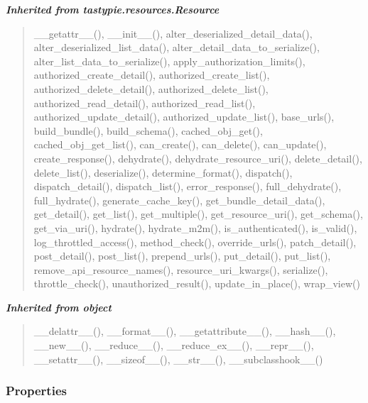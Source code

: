 \large{\textbf{\textit{Inherited from tastypie.resources.Resource}}}

\begin{quote}
\_\_getattr\_\_(), \_\_init\_\_(), alter\_deserialized\_detail\_data(), alter\_deserialized\_list\_data(), alter\_detail\_data\_to\_serialize(), alter\_list\_data\_to\_serialize(), apply\_authorization\_limits(), authorized\_create\_detail(), authorized\_create\_list(), authorized\_delete\_detail(), authorized\_delete\_list(), authorized\_read\_detail(), authorized\_read\_list(), authorized\_update\_detail(), authorized\_update\_list(), base\_urls(), build\_bundle(), build\_schema(), cached\_obj\_get(), cached\_obj\_get\_list(), can\_create(), can\_delete(), can\_update(), create\_response(), dehydrate(), dehydrate\_resource\_uri(), delete\_detail(), delete\_list(), deserialize(), determine\_format(), dispatch(), dispatch\_detail(), dispatch\_list(), error\_response(), full\_dehydrate(), full\_hydrate(), generate\_cache\_key(), get\_bundle\_detail\_data(), get\_detail(), get\_list(), get\_multiple(), get\_resource\_uri(), get\_schema(), get\_via\_uri(), hydrate(), hydrate\_m2m(), is\_authenticated(), is\_valid(), log\_throttled\_access(), method\_check(), override\_urls(), patch\_detail(), post\_detail(), post\_list(), prepend\_urls(), put\_detail(), put\_list(), remove\_api\_resource\_names(), resource\_uri\_kwargs(), serialize(), throttle\_check(), unauthorized\_result(), update\_in\_place(), wrap\_view()
\end{quote}

\large{\textbf{\textit{Inherited from object}}}

\begin{quote}
\_\_delattr\_\_(), \_\_format\_\_(), \_\_getattribute\_\_(), \_\_hash\_\_(), \_\_new\_\_(), \_\_reduce\_\_(), \_\_reduce\_ex\_\_(), \_\_repr\_\_(), \_\_setattr\_\_(), \_\_sizeof\_\_(), \_\_str\_\_(), \_\_subclasshook\_\_()
\end{quote}


  \subsubsection{Properties}

